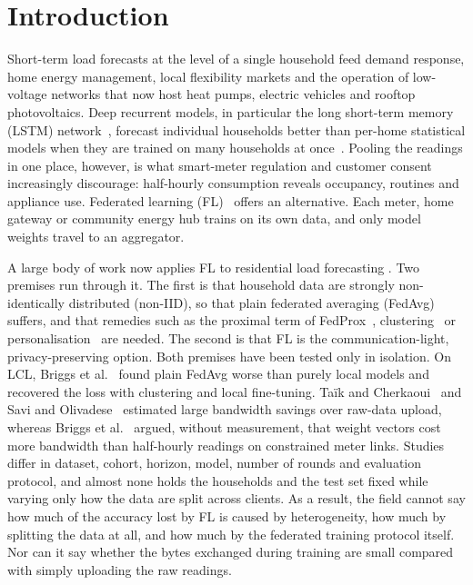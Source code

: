 \section{Introduction}\label{sec:intro}

Short-term load forecasts at the level of a single household feed demand response, home energy management, local
flexibility markets and the operation of low-voltage networks that now host heat pumps, electric vehicles and rooftop
photovoltaics. Deep recurrent models, in particular the long short-term memory (LSTM) network~\cite{hochreiter1997lstm},
forecast individual households better than per-home statistical models when they are trained on many households
at once~\cite{kong2019stlf}. Pooling the readings in one place, however, is what smart-meter regulation and customer
consent increasingly discourage: half-hourly consumption reveals occupancy, routines and appliance use. Federated
learning (FL)~\cite{mcmahan2017fedavg,kairouz2021advances} offers an alternative. Each meter, home gateway or community
energy hub trains on its own data, and only model weights travel to an aggregator.

A large body of work now applies FL to residential load forecasting
\cite{fernndez2022,fekri2022,gholizadeh2022,widmer2023,qu2023,liu2023,fekri2023,das2026,wang2026,tibermacine2026}.
Two premises run through it. The first is that household data are strongly non-identically distributed (non-IID),
so that plain federated averaging (FedAvg) suffers, and that remedies such as the proximal term of
FedProx~\cite{li2020fedprox}, clustering~\cite{gholizadeh2022,dogra2023} or personalisation~\cite{qu2023,widmer2023,das2026}
are needed. The second is that FL is the communication-light, privacy-preserving option. Both premises have been tested only in
isolation. On LCL, Briggs et al.~\cite{briggs2022} found plain FedAvg worse than purely local models and recovered
the loss with clustering and local fine-tuning. Taïk and Cherkaoui~\cite{taik2020} and Savi and
Olivadese~\cite{savi2021} estimated large bandwidth savings over raw-data upload, whereas Briggs et
al.~\cite{briggs2020ccai} argued, without measurement, that weight vectors cost more bandwidth than half-hourly
readings on constrained meter links. Studies differ in dataset, cohort, horizon, model, number of rounds and evaluation
protocol, and almost none holds the households and the test set fixed while varying only how the data are split
across clients. As a result, the field cannot say how much of the accuracy lost by FL is caused by heterogeneity,
how much by splitting the data at all, and how much by the federated training protocol itself. Nor can it say
whether the bytes exchanged during training are small compared with simply uploading the raw readings.

